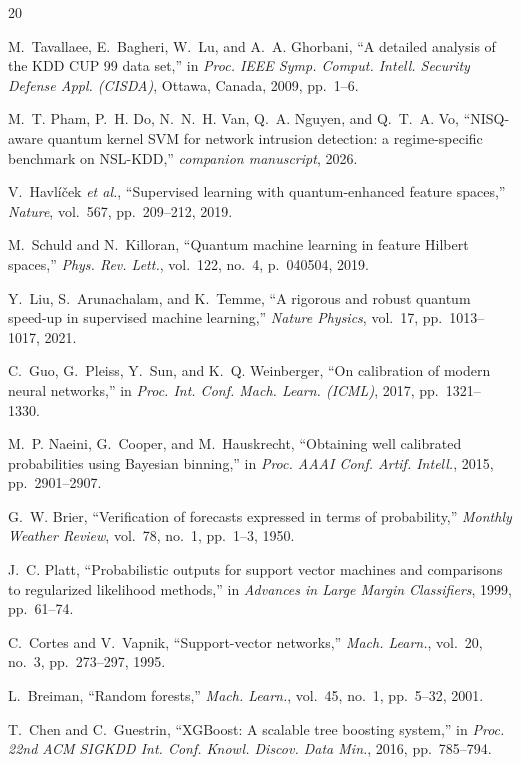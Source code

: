 \documentclass[journal]{IEEEtran}
\begin{document}
\begin{thebibliography}{20}

M.~Tavallaee, E.~Bagheri, W.~Lu, and A.~A. Ghorbani,
``A detailed analysis of the KDD CUP 99 data set,'' in
\emph{Proc. IEEE Symp. Comput. Intell. Security Defense Appl. (CISDA)},
Ottawa, Canada, 2009, pp.~1--6.

M.~T. Pham, P.~H. Do, N.~N.~H. Van, Q.~A. Nguyen, and Q.~T.~A. Vo,
``NISQ-aware quantum kernel SVM for network intrusion detection: a
  regime-specific benchmark on NSL-KDD,'' \emph{companion manuscript},
  2026.

V.~Havl\'i\v{c}ek \emph{et al.},
``Supervised learning with quantum-enhanced feature spaces,''
\emph{Nature}, vol.~567, pp.~209--212, 2019.

M.~Schuld and N.~Killoran,
``Quantum machine learning in feature Hilbert spaces,''
\emph{Phys. Rev. Lett.}, vol.~122, no.~4, p.~040504, 2019.

Y.~Liu, S.~Arunachalam, and K.~Temme,
``A rigorous and robust quantum speed-up in supervised machine
  learning,'' \emph{Nature Physics}, vol.~17, pp.~1013--1017, 2021.

C.~Guo, G.~Pleiss, Y.~Sun, and K.~Q. Weinberger,
``On calibration of modern neural networks,'' in
\emph{Proc. Int. Conf. Mach. Learn. (ICML)}, 2017, pp.~1321--1330.

M.~P. Naeini, G.~Cooper, and M.~Hauskrecht,
``Obtaining well calibrated probabilities using Bayesian binning,''
in \emph{Proc. AAAI Conf. Artif. Intell.}, 2015, pp.~2901--2907.

G.~W. Brier,
``Verification of forecasts expressed in terms of probability,''
\emph{Monthly Weather Review}, vol.~78, no.~1, pp.~1--3, 1950.

J.~C. Platt,
``Probabilistic outputs for support vector machines and comparisons
  to regularized likelihood methods,'' in
\emph{Advances in Large Margin Classifiers}, 1999, pp.~61--74.

C.~Cortes and V.~Vapnik, ``Support-vector networks,''
\emph{Mach. Learn.}, vol.~20, no.~3, pp.~273--297, 1995.

L.~Breiman, ``Random forests,'' \emph{Mach. Learn.}, vol.~45, no.~1,
pp.~5--32, 2001.

T.~Chen and C.~Guestrin,
``XGBoost: A scalable tree boosting system,'' in
\emph{Proc. 22nd ACM SIGKDD Int. Conf. Knowl. Discov. Data Min.},
2016, pp.~785--794.


\end{thebibliography}
\end{document}
